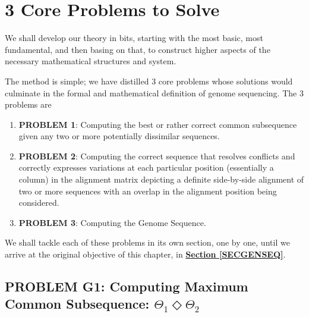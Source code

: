 \documentclass[a4paper, 18pt]{book} %
\begin{document}
\section{3 Core Problems to Solve}
\label{SEC3COREPROB}

We shall develop our theory in bits, starting with the most basic, most fundamental, and then basing on that, to construct higher aspects of the necessary mathematical structures and system.

The method is simple; we have distilled 3 core problems whose solutions would culminate in the formal and mathematical definition of genome sequencing. The 3 problems are


\begin{enumerate}
\item \textbf{PROBLEM 1}: Computing the best or rather correct common subsequence given any two or more potentially dissimilar sequences.
\item \textbf{PROBLEM 2}: Computing the correct sequence that resolves conflicts and correctly expresses variations at each particular position (essentially a column) in the alignment matrix depicting a definite side-by-side alignment of two or more sequences with an overlap in the alignment position being considered.
\item \textbf{PROBLEM 3}: Computing the Genome Sequence.
\end{enumerate}

We shall tackle each of these problems in its own section, one by one, until we arrive at the original objective of this chapter, in \textbf{\hyperref[SECGENSEQ]{Section \ref{SECGENSEQ}}}.

\subsection{PROBLEM G1: Computing Maximum Common Subsequence: $\Theta_1 \Diamond \Theta_2$}
\label{PROBG1}
\end{document}
